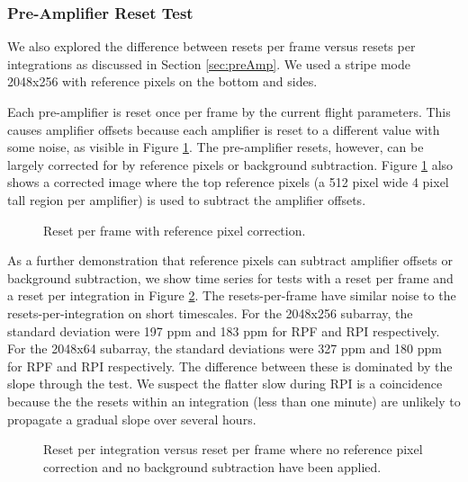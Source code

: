 \documentclass{aastex62}
\begin{document}
\clearpage
\subsubsection{Pre-Amplifier Reset Test}
We also explored the difference between resets per frame versus resets per integrations as discussed in Section \ref{sec:preAmp}.
We used a stripe mode 2048x256 with reference pixels on the bottom and sides.

Each pre-amplifier is reset once per frame by the current flight parameters.
This causes amplifier offsets because each amplifier is reset to a different value with some noise, as visible in Figure \ref{fig:RPFrefpix}.
The pre-amplifier resets, however, can be largely corrected for by reference pixels or background subtraction.
Figure \ref{fig:RPFrefpix} also shows a corrected image where the top reference pixels (a 512 pixel wide 4 pixel tall region per amplifier) is used to subtract the amplifier offsets.

\begin{figure}
{}
{}
\caption{Reset per frame with reference pixel correction.}\label{fig:RPFrefpix}
\end{figure}

As a further demonstration that reference pixels can subtract amplifier offsets or background subtraction, we show time series for tests with a reset per frame and a reset per integration in Figure \ref{fig:RPFvsRPItseries}.
The resets-per-frame have similar noise to the resets-per-integration on short timescales.
For the 2048x256 subarray, the standard deviation were 197 ppm and 183 ppm for RPF and RPI respectively.
For the 2048x64 subarray, the standard deviations were 327 ppm and 180 ppm for RPF and RPI respectively.
The difference between these is dominated by the slope through the test.
We suspect the flatter slow during RPI is a coincidence because the the resets within an integration (less than one minute) are unlikely to propagate a gradual slope over several hours.


\begin{figure}
{}
{}
\caption{Reset per integration versus reset per frame where no reference pixel correction and no background subtraction have been applied.}\label{fig:RPFvsRPItseries}
\end{figure}
\end{document}
